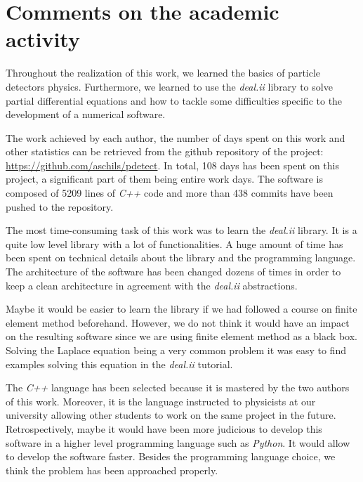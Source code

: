 \documentclass[11pt]{article}
\begin{document}
		\section{Comments on the academic activity} \label{App:academic}


		Throughout the realization of this work, we learned the	basics of
		particle detectors physics. Furthermore, we learned to use the \textit{deal.ii}
		library to solve partial differential equations and how to tackle some
		difficulties specific to the development of a numerical software.

		The work achieved by each author, the number of days spent on this work
		and other statistics can be retrieved from the github repository of the
		project: \url{https://github.com/aschils/pdetect}. In total, 108 days
		has been spent on this project, a significant part of them being entire
		work days. The software is composed of 5209 lines of \textit{C++} code and
		more than 438 commits have been pushed to the repository.

		The most time-consuming task of this work was to learn the \textit{deal.ii}
		library. It is a quite low level library with a lot of functionalities.
		A huge amount of time has been spent on technical details about the
		library and the programming language. The architecture of the software
		has been changed dozens of times in order to keep a clean architecture in
		agreement with the \textit{deal.ii} abstractions.

		Maybe it would be easier to learn the library if we had followed
		a course on finite element method beforehand. However, we do not think
		it would have an impact on the resulting software since we are using
		finite element method as a black box. Solving the Laplace equation being
		a very common problem it was easy to find examples solving this equation
		in the \textit{deal.ii} tutorial.

		The \textit{C++} language has been selected because it is mastered by the two authors of this
		work. Moreover, it is the language instructed to physicists at our university
		allowing other students to work on the same project in the future.
		Retrospectively, maybe it would have been more judicious to develop
		this software in a higher level programming language such as \textit{Python}.
		It would allow to develop the software faster. Besides the programming
		language choice, we think the problem has been approached properly.

\newpage




\end{document}
